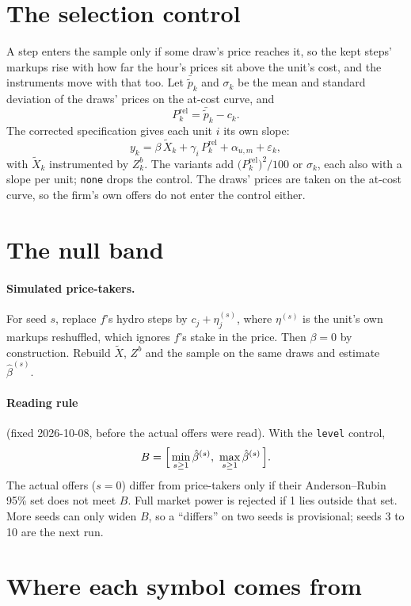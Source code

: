 \documentclass[11pt]{article}
\newcommand{\Xt}{\tilde X}
\newcommand{\code}[1]{\texttt{\small #1}}
\begin{document}
\section{The selection control}

A step enters the sample only if some draw's price reaches it, so the kept steps' markups
rise with how far the hour's prices sit above the unit's cost, and the instruments move with
that too. Let $\bar{\tilde p}_k$ and $\sigma_k$ be the mean and standard deviation of the
draws' prices on the at-cost curve, and
\[
  P^{\text{rel}}_k = \bar{\tilde p}_k - c_k .
\]
The corrected specification gives each unit $i$ its own slope:
\[
  y_k = \beta\,\Xt_k + \gamma_i\,P^{\text{rel}}_k + \alpha_{u,m} + \varepsilon_k ,
\]
with $\Xt_k$ instrumented by $Z^b_k$. The variants add $\bigl(P^{\text{rel}}_k\bigr)^2/100$ or
$\sigma_k$, each also with a slope per unit; \code{none} drops the control. The draws' prices
are taken on the at-cost curve, so the firm's own offers do not enter the control either.

\section{The null band}

\paragraph{Simulated price-takers.} For seed $s$, replace $f$'s hydro steps by $c_j +
\eta_j^{(s)}$, where $\eta^{(s)}$ is the unit's own markups reshuffled, which ignores $f$'s
stake in the price. Then $\beta = 0$ by construction. Rebuild $\Xt$, $Z^b$ and the sample on
the same draws and estimate $\hat\beta^{(s)}$.

\paragraph{Reading rule} (fixed 2026-10-08, before the actual offers were read). With the
\code{level} control,
\[
  B = \Bigl[\, \min_{s \ge 1} \hat\beta^{(s)},\ \max_{s \ge 1} \hat\beta^{(s)} \,\Bigr].
\]
The actual offers ($s=0$) differ from price-takers only if their Anderson--Rubin 95\% set
does not meet $B$. Full market power is rejected if 1 lies outside that set. More seeds can
only widen $B$, so a ``differs'' on two seeds is provisional; seeds 3 to 10 are the next run.

\section{Where each symbol comes from}\label{sec:data}
\end{document}

